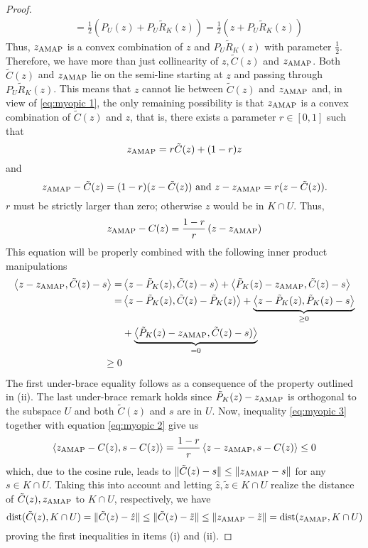 \documentclass[smallextended,numbook,nospthms]{svjour3}
\theoremstyle{plain}
\theoremstyle{definition}
\DeclareMathOperator{\dist}{dist}
\newcommand{\scal}[2]{\left\langle{#1},{#2}  \right\rangle}
\newcommand{\AMAP}{{\rm AMAP}}
\begin{document}
\begin{proof}
\begin{align}
		&=\frac{1}{2}\left(P_{U}(z)+P_{U} \tilde{R}_{K}(z)\right)=\frac{1}{2}\left(z+P_{U} \tilde{R}_{K}(z)\right)
	\end{align}
	Thus, $z_{\AMAP}$ is a convex combination of $z$ and $P_{U}\tilde{R}_{K}(z)$ with parameter $\frac{1}{2}$. Therefore, we have more than just collinearity of $z, \tilde{C}(z)$ and $z_{\AMAP}$. Both $\tilde{C}(z)$ and $z_{\AMAP}$ lie on the semi-line starting at $z$ and passing through $P_{U}\tilde{R}_{K}(z)$. This means that $z$ cannot lie between $\tilde{C}(z)$ and $z_{\AMAP}$ and, in view of \cref{eq:myopic 1}, the only remaining possibility is that $z_{\AMAP}$ is a convex combination of $\tilde{C}(z)$ and $z$, that is, there exists a parameter $r \in[0,1]$ such that
	\begin{equation}
		z_{\AMAP}=r\tilde{C}(z)+(1-r)z
	\end{equation}
	and
	\begin{equation}
		z_{\AMAP}-\tilde{C}(z)=(1-r)(z-\tilde{C}(z)) \text { and } z-z_{\AMAP}=r(z-\tilde{C}(z)).
	\end{equation}
	$r$ must be strictly larger than zero;  otherwise $z$ would be in $K \cap U$. Thus,
	\begin{equation}\label{eq:myopic 2}
		z_{\AMAP}-C(z)=\frac{1-r}{r}\left(z-z_{\AMAP}\right)
	\end{equation}
	This equation will be properly combined with the following inner product manipulations
	\begin{align}
		\scal{z-z_{\AMAP}}{\tilde{C}(z)-s}=&\scal{z-\tilde{P}_{K}(z)}{\tilde{C}(z)-s}+\scal{\tilde{P}_{K}(z)-z_{\AMAP}}{\tilde{C}(z)-s} \notag \\
		=&\scal{z-\tilde{P}_{K}(z)}{\tilde{C}(z)-\tilde{P}_{K}(z)}+\underbrace{\scal{z-\tilde{P}_{K}(z)}{\tilde{P}_{K}(z)-s}}_{\geq 0} \notag \\
		&+\underbrace{\scal{\tilde{P}_{K}(z)-z_{\AMAP}}{\tilde{C}(z)-s)}}_{=0}  \\
		\geq 0\label{eq:myopic 3}
	\end{align}
	The first under-brace equality follows as a consequence of the property outlined in (ii). The last under-brace remark holds since $\tilde{P}_{K}(z)-z_{\AMAP}$ is orthogonal to the subspace $U$ and both $\tilde{C}(z)$ and $s$ are in $U $. Now, inequality \cref{eq:myopic 3} together with equation \cref{eq:myopic 2} give us
	\begin{equation}
		\scal{z_{\AMAP}-C(z)}{s-C(z)}=\frac{1-r}{r}\scal{z-z_{\AMAP}}{s-C(z)} \leq 0
	\end{equation}
	which, due to the cosine rule, leads to $\|\tilde{C}(z)-s\| \leq\|z_{\AMAP}-s\|$ for any $s \in K \cap U$. Taking this into account and letting $\hat{z}, \tilde{z} \in K \cap U$ realize the distance of $\tilde{C}(z), z_{\AMAP}$ to $K \cap U$, respectively, we have
	\begin{equation}
		\dist(\tilde{C}(z), K \cap U)=\|\tilde{C}(z)-\hat{z}\| \leq\|\tilde{C}(z)-\tilde{z}\| \leq\|z_{\AMAP}-\tilde{z}\|=\dist(z _{\AMAP}, K \cap U)	
	\end{equation}
	proving the first inequalities in items (i) and (ii).
\end{proof}
\end{document}
